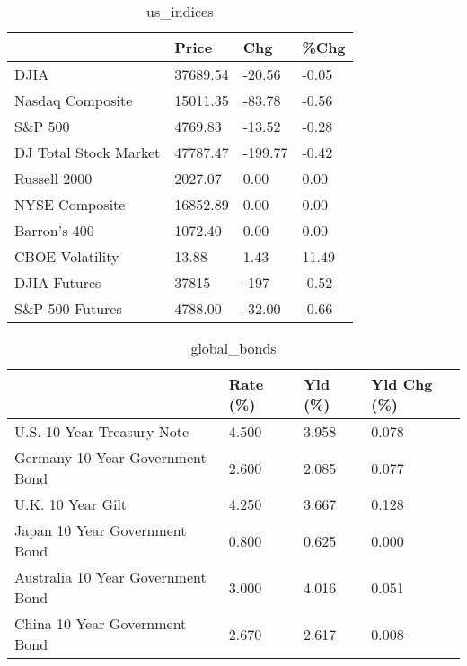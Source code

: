 \documentclass{article}%
\begin{document}
%


\begin{table}[htbp]%
\caption{us\_indices}%
\centering%
\begin{adjustbox}{width=1\textwidth}%
\begin{tabular}{llll}
\toprule
                      &    Price &     Chg &  \%Chg \\
\midrule
                 DJIA & 37689.54 &  -20.56 & -0.05 \\
     Nasdaq Composite & 15011.35 &  -83.78 & -0.56 \\
              S\&P 500 &  4769.83 &  -13.52 & -0.28 \\
DJ Total Stock Market & 47787.47 & -199.77 & -0.42 \\
         Russell 2000 &  2027.07 &    0.00 &  0.00 \\
       NYSE Composite & 16852.89 &    0.00 &  0.00 \\
         Barron's 400 &  1072.40 &    0.00 &  0.00 \\
      CBOE Volatility &    13.88 &    1.43 & 11.49 \\
         DJIA Futures &    37815 &    -197 & -0.52 \\
      S\&P 500 Futures &  4788.00 &  -32.00 & -0.66 \\
\bottomrule
\end{tabular}
%
\end{adjustbox}%
\end{table}

%


\begin{table}[htbp]%
\caption{global\_bonds}%
\centering%
\begin{adjustbox}{width=1\textwidth}%
\begin{tabular}{llll}
\toprule
                                  & Rate (\%) & Yld (\%) & Yld Chg (\%) \\
\midrule
       U.S. 10 Year Treasury Note &    4.500 &   3.958 &       0.078 \\
  Germany 10 Year Government Bond &    2.600 &   2.085 &       0.077 \\
                U.K. 10 Year Gilt &    4.250 &   3.667 &       0.128 \\
    Japan 10 Year Government Bond &    0.800 &   0.625 &       0.000 \\
Australia 10 Year Government Bond &    3.000 &   4.016 &       0.051 \\
    China 10 Year Government Bond &    2.670 &   2.617 &       0.008 \\
\bottomrule
\end{tabular}
%
\end{adjustbox}%
\end{table}
\end{document}
